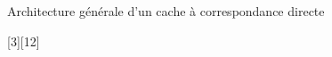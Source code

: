 %
\begin{Frame}{Architecture générale d'un cache à correspondance directe}
      
\vspace{-0,8cm}
        \begin{center}
       [3][12] \hspace{2cm}
        \end{center}



      
\end{Frame}


